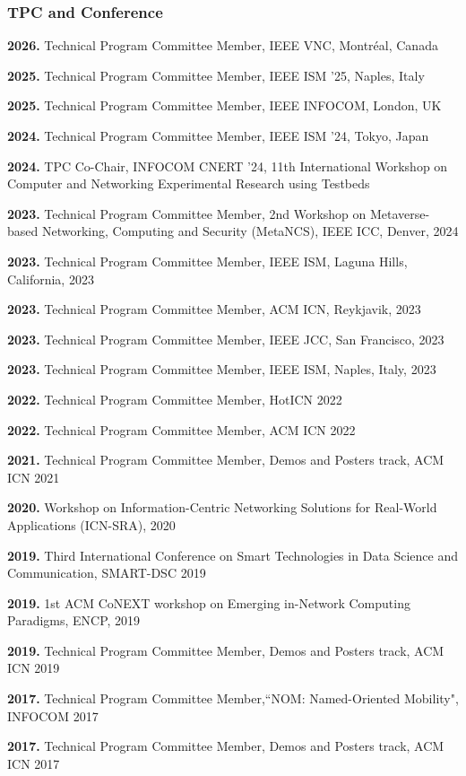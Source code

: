 \subsubsection{TPC and Conference }
\begin{cvlist}
    \item \textbf{2026.}   Technical Program Committee Member, IEEE VNC, Montréal, Canada
    \item \textbf{2025.}   Technical Program Committee Member, IEEE ISM '25, Naples, Italy
    \item \textbf{2025.}   Technical Program Committee Member, IEEE INFOCOM, London, UK
    \item \textbf{2024.}   Technical Program Committee Member, IEEE ISM '24, Tokyo, Japan
    \item \textbf{2024.}  TPC Co-Chair, INFOCOM CNERT '24,  11th International Workshop on Computer and Networking Experimental Research using Testbeds
    \item  \textbf{2023.} Technical Program Committee Member,  2nd Workshop on Metaverse-based Networking, Computing and Security (MetaNCS), IEEE ICC, Denver, 2024
    \item  \textbf{2023.} Technical Program Committee Member, IEEE ISM, Laguna Hills, California, 2023
    \item  \textbf{2023.} Technical Program Committee Member, ACM ICN, Reykjavik, 2023 
    \item  \textbf{2023.} Technical Program Committee Member, IEEE JCC, San Francisco, 2023 
    \item  \textbf{2023.} Technical Program Committee Member, IEEE ISM, Naples, Italy, 2023
    \item  \textbf{2022.} Technical Program Committee Member, HotICN 2022    
    \item  \textbf{2022.} Technical Program Committee Member, ACM ICN 2022
    \item  \textbf{2021.} Technical Program Committee Member, Demos and Posters track, ACM ICN 2021
    \item \textbf{2020.} Workshop on Information-Centric Networking Solutions for Real-World Applications (ICN-SRA), 2020
\item  \textbf{2019.} Third International Conference on Smart Technologies in Data Science and Communication, SMART-DSC 2019
	\item  \textbf{2019.} 1st ACM CoNEXT workshop on Emerging in-Network Computing Paradigms, ENCP, 2019
	\item  \textbf{2019.} Technical Program Committee Member, Demos and Posters track, ACM ICN 2019
    \item  \textbf{2017.} Technical Program Committee Member,``NOM: Named-Oriented Mobility", INFOCOM 2017
    \item  \textbf{2017.} Technical Program Committee Member, Demos and Posters track, ACM ICN 2017
\end{cvlist}

